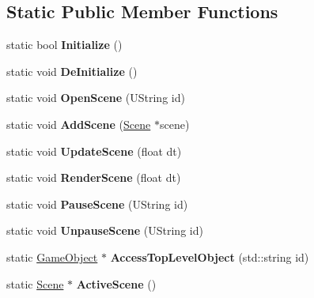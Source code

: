 \subsection*{Static Public Member Functions}
\begin{DoxyCompactItemize}
\item 
\hypertarget{class_vixen_1_1_scene_manager_abe063da52aee75f5b548369f2fb4bfe0}{}static bool {\bfseries Initialize} ()\label{class_vixen_1_1_scene_manager_abe063da52aee75f5b548369f2fb4bfe0}

\item 
\hypertarget{class_vixen_1_1_scene_manager_ab304a7eb29f598443dbcb5944e634c5e}{}static void {\bfseries De\+Initialize} ()\label{class_vixen_1_1_scene_manager_ab304a7eb29f598443dbcb5944e634c5e}

\item 
\hypertarget{class_vixen_1_1_scene_manager_af88ce739671f935d68a1caa4f34401b1}{}static void {\bfseries Open\+Scene} (U\+String id)\label{class_vixen_1_1_scene_manager_af88ce739671f935d68a1caa4f34401b1}

\item 
\hypertarget{class_vixen_1_1_scene_manager_a381aa8d3b4bb4a48cd1843b209b764e9}{}static void {\bfseries Add\+Scene} (\hyperlink{class_vixen_1_1_scene}{Scene} $\ast$scene)\label{class_vixen_1_1_scene_manager_a381aa8d3b4bb4a48cd1843b209b764e9}

\item 
\hypertarget{class_vixen_1_1_scene_manager_a6b7c68ede088d7f0659c1ada7a4558da}{}static void {\bfseries Update\+Scene} (float dt)\label{class_vixen_1_1_scene_manager_a6b7c68ede088d7f0659c1ada7a4558da}

\item 
\hypertarget{class_vixen_1_1_scene_manager_aa75b511ecc17379e5a75902bc437a178}{}static void {\bfseries Render\+Scene} (float dt)\label{class_vixen_1_1_scene_manager_aa75b511ecc17379e5a75902bc437a178}

\item 
\hypertarget{class_vixen_1_1_scene_manager_ab0daecfb4a7ca6914cf45cabb041f7ab}{}static void {\bfseries Pause\+Scene} (U\+String id)\label{class_vixen_1_1_scene_manager_ab0daecfb4a7ca6914cf45cabb041f7ab}

\item 
\hypertarget{class_vixen_1_1_scene_manager_a86762ff32c46a31b0c975628a72e8b8b}{}static void {\bfseries Unpause\+Scene} (U\+String id)\label{class_vixen_1_1_scene_manager_a86762ff32c46a31b0c975628a72e8b8b}

\item 
\hypertarget{class_vixen_1_1_scene_manager_abc3fecfaab34f4a7e8266b877196864c}{}static \hyperlink{class_vixen_1_1_game_object}{Game\+Object} $\ast$ {\bfseries Access\+Top\+Level\+Object} (std\+::string id)\label{class_vixen_1_1_scene_manager_abc3fecfaab34f4a7e8266b877196864c}

\item 
\hypertarget{class_vixen_1_1_scene_manager_ab7cb72f5864cf3abc74cdad8bfc276f0}{}static \hyperlink{class_vixen_1_1_scene}{Scene} $\ast$ {\bfseries Active\+Scene} ()\label{class_vixen_1_1_scene_manager_ab7cb72f5864cf3abc74cdad8bfc276f0}

\end{DoxyCompactItemize}


